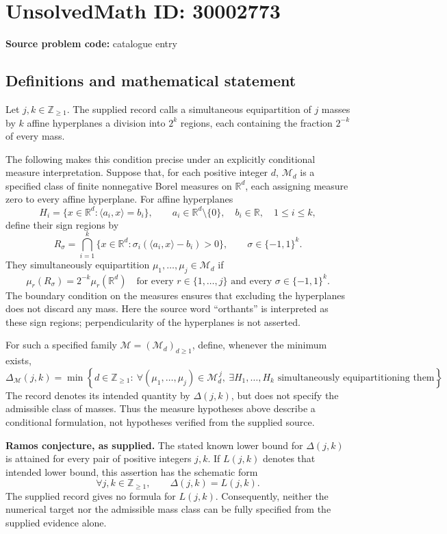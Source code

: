 \documentclass[11pt]{article}
\newcommand{\Z}{\mathbb{Z}}
\newcommand{\R}{\mathbb{R}}
\begin{document}
\section*{UnsolvedMath ID: 30002773}
\textbf{Source problem code:} catalogue entry
\subsection{Definitions and mathematical statement}
Let \(j,k\in\Z_{\geq 1}\). The supplied record calls a simultaneous equipartition of \(j\) masses by \(k\) affine hyperplanes a division into \(2^k\) regions, each containing the fraction \(2^{-k}\) of every mass.

The following makes this condition precise under an explicitly conditional measure interpretation. Suppose that, for each positive integer \(d\), \(\mathcal M_d\) is a specified class of finite nonnegative Borel measures on \(\R^d\), each assigning measure zero to every affine hyperplane. For affine hyperplanes
\[
H_i=\{x\in\R^d:\langle a_i,x\rangle=b_i\},\qquad a_i\in\R^d\setminus\{0\},\quad b_i\in\R,\quad 1\leq i\leq k,
\]
define their sign regions by
\[
R_{\sigma}=\bigcap_{i=1}^k\{x\in\R^d:\sigma_i(\langle a_i,x\rangle-b_i)>0\},\qquad \sigma\in\{-1,1\}^k.
\]
They simultaneously equipartition \(\mu_1,\ldots,\mu_j\in\mathcal M_d\) if
\[
\mu_r(R_{\sigma})=2^{-k}\mu_r(\R^d)
\quad\text{for every }r\in\{1,\ldots,j\}\text{ and every }\sigma\in\{-1,1\}^k.
\]
The boundary condition on the measures ensures that excluding the hyperplanes does not discard any mass. Here the source word ``orthants'' is interpreted as these sign regions; perpendicularity of the hyperplanes is not asserted.

For such a specified family \(\mathcal M=(\mathcal M_d)_{d\geq1}\), define, whenever the minimum exists,
\[
\Delta_{\mathcal M}(j,k)=\min\left\{d\in\Z_{\geq1}:\ \forall(\mu_1,\ldots,\mu_j)\in\mathcal M_d^{\,j},\ \exists H_1,\ldots,H_k\text{ simultaneously equipartitioning them}\right\}.
\]
The record denotes its intended quantity by \(\Delta(j,k)\), but does not specify the admissible class of masses. Thus the measure hypotheses above describe a conditional formulation, not hypotheses verified from the supplied source.

\textbf{Ramos conjecture, as supplied.} The stated known lower bound for \(\Delta(j,k)\) is attained for every pair of positive integers \(j,k\). If \(L(j,k)\) denotes that intended lower bound, this assertion has the schematic form
\[
\forall j,k\in\Z_{\geq1},\qquad \Delta(j,k)=L(j,k).
\]
The supplied record gives no formula for \(L(j,k)\). Consequently, neither the numerical target nor the admissible mass class can be fully specified from the supplied evidence alone.
\end{document}
